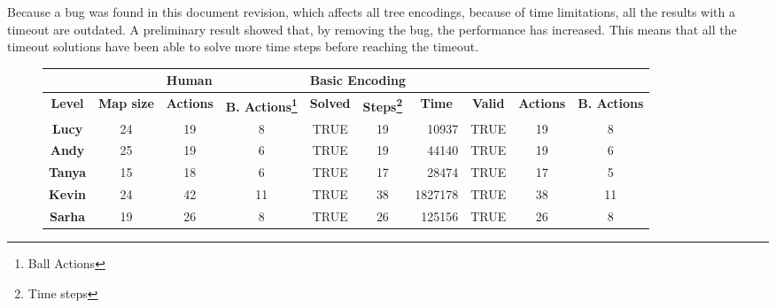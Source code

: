 \documentclass{report}
\theoremstyle{plain}
\begin{document}
Because a bug was found in this document revision, which affects all tree encodings, because of time limitations, all the results with a timeout are outdated. A preliminary result showed that, by removing the bug, the performance has increased. This means that all the timeout solutions have been able to solve more time steps before reaching the timeout.

\begin{figure}
    \centering
\begin{tabular}{cc|c|c|c|c|r|c|c|c|}
\cline{3-10}
                                                     & \multicolumn{1}{l|}{\textbf{}}          & \multicolumn{2}{l|}{\textbf{Human}}      & \multicolumn{6}{l|}{\textbf{Basic Encoding}}                                                                 \\ \hline
\multicolumn{1}{|c|}{\textbf{Level}}                 & \textbf{Map size} & \textbf{Actions} & \textbf{B. Actions\footnote{Ball Actions}} & \textbf{Solved} & \textbf{Steps\footnote{Time steps}} & \multicolumn{1}{c|}{\textbf{Time}} & \textbf{Valid} & \textbf{Actions} & \textbf{B. Actions} \\ \hline
\multicolumn{1}{|c|}{\textbf{Lucy}}                  & 24                & 19               & 8                     & TRUE            & 19                 & 10937         & TRUE           & 19               & 8                     \\ \hline
\multicolumn{1}{|c|}{\textbf{Andy}}                  & 25                & 19               & 6                     & TRUE            & 19                 & 44140         & TRUE           & 19               & 6                     \\ \hline
\multicolumn{1}{|c|}{\textbf{Tanya}}                 & 15                & 18               & 6                     & TRUE            & 17                 & 28474         & TRUE           & 17               & 5                     \\ \hline
\multicolumn{1}{|c|}{\textbf{Kevin}}                 & 24                & 42               & 11                    & TRUE            & 38                 & 1827178       & TRUE           & 38               & 11                    \\ \hline
\multicolumn{1}{|c|}{\textbf{Sarha}}                 & 19                & 26               & 8                     & TRUE            & 26                 & 125156        & TRUE           & 26               & 8                     \\ \hline

\end{tabular}
\end{figure}
\end{document}
